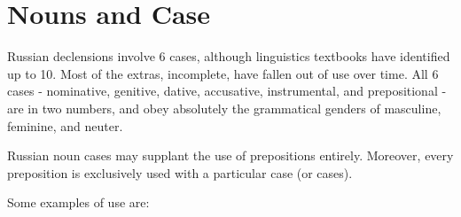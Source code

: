 \documentclass[
  a4paperpaper,
]{report}
\begin{document}
\hypertarget{nouns-and-case}{%
\section{Nouns and Case}\label{nouns-and-case}}

Russian declensions involve 6 cases, although linguistics textbooks have
identified up to 10. Most of the extras, incomplete, have fallen out of
use over time. All 6 cases - nominative, genitive, dative, accusative,
instrumental, and prepositional - are in two numbers, and obey
absolutely the grammatical genders of masculine, feminine, and neuter.

Russian noun cases may supplant the use of prepositions entirely.
Moreover, every preposition is exclusively used with a particular case
(or cases).

Some examples of use are:
\end{document}
